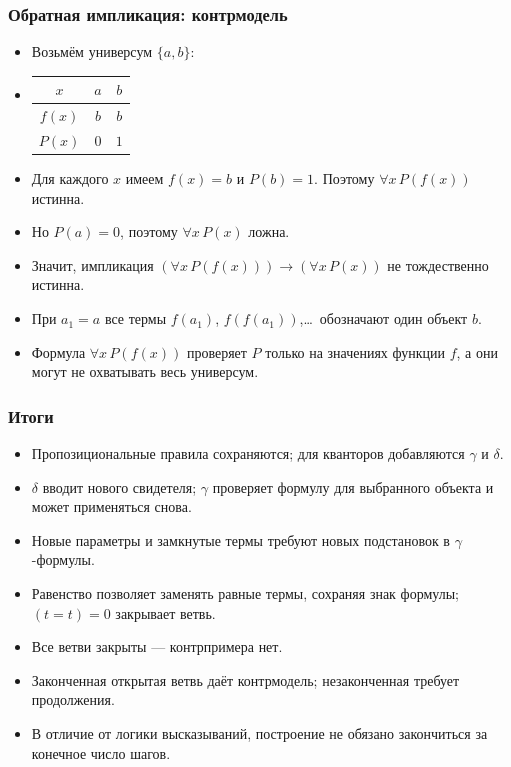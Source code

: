 \documentclass[10pt]{beamer}
\begin{document}
\begin{frame}
\frametitle{Обратная импликация: контрмодель}
\begin{itemize}
    \item Возьмём универсум $\{a,b\}$:
    \item[] {\setlength{\tabcolsep}{1em}
    \begin{tabular}{c|c|c}
        $x$ & $a$ & $b$ \\ \hline
        $f(x)$ & $b$ & $b$ \\
        $P(x)$ & $0$ & $1$
    \end{tabular}}
    \pause
    \item Для каждого $x$ имеем $f(x)=b$ и $P(b)=1$. Поэтому $\forall x\,P(f(x))$ истинна.
    \item Но $P(a)=0$, поэтому $\forall x\,P(x)$ ложна.
    \pause
    \item Значит, импликация $(\forall x\,P(f(x)))\to(\forall x\,P(x))$ не тождественно истинна.
    \item При $a_1=a$ все термы $f(a_1)$, $f(f(a_1))$,\ldots\ обозначают один объект $b$.
    \item Формула $\forall x\,P(f(x))$ проверяет $P$ только на значениях функции $f$, а они могут не охватывать весь универсум.
\end{itemize}
\end{frame}

\begin{frame}
\frametitle{Итоги}
\begin{itemize}
    \item Пропозициональные правила сохраняются; для кванторов добавляются $\gamma$ и $\delta$.
    \item $\delta$ вводит нового свидетеля; $\gamma$ проверяет формулу для выбранного объекта и может применяться снова.
    \item Новые параметры и замкнутые термы требуют новых подстановок в $\gamma$-формулы.
    \item Равенство позволяет заменять равные термы, сохраняя знак формулы; $(t=t)=0$ закрывает ветвь.
    \item Все ветви закрыты --- контрпримера нет.
    \item Законченная открытая ветвь даёт контрмодель; незаконченная требует продолжения.
    \item В отличие от логики высказываний, построение не обязано закончиться за конечное число шагов.
\end{itemize}
\end{frame}
\end{document}
